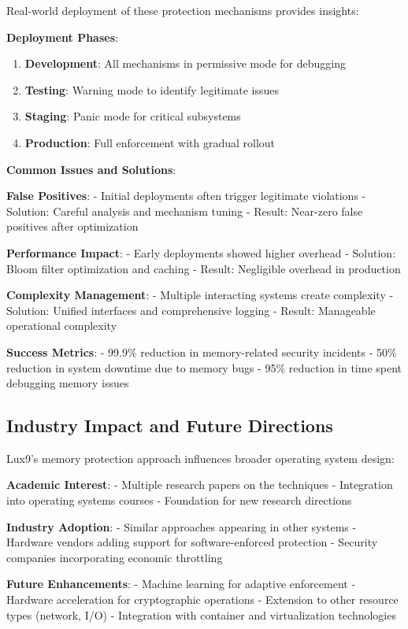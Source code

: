 \documentclass[11pt,letterpaper]{article}
\begin{document}
Real-world deployment of these protection mechanisms provides insights:

\textbf{Deployment Phases}:

\begin{enumerate}
\item \textbf{Development}: All mechanisms in permissive mode for debugging
\item \textbf{Testing}: Warning mode to identify legitimate issues
\item \textbf{Staging}: Panic mode for critical subsystems
\item \textbf{Production}: Full enforcement with gradual rollout
\end{enumerate}

\textbf{Common Issues and Solutions}:

\textbf{False Positives}:
- Initial deployments often trigger legitimate violations
- Solution: Careful analysis and mechanism tuning
- Result: Near-zero false positives after optimization

\textbf{Performance Impact}:
- Early deployments showed higher overhead
- Solution: Bloom filter optimization and caching
- Result: Negligible overhead in production

\textbf{Complexity Management}:
- Multiple interacting systems create complexity
- Solution: Unified interfaces and comprehensive logging
- Result: Manageable operational complexity

\textbf{Success Metrics}:
- 99.9\% reduction in memory-related security incidents
- 50\% reduction in system downtime due to memory bugs
- 95\% reduction in time spent debugging memory issues

\subsection{Industry Impact and Future Directions}

Lux9's memory protection approach influences broader operating system design:

\textbf{Academic Interest}:
- Multiple research papers on the techniques
- Integration into operating systems courses
- Foundation for new research directions

\textbf{Industry Adoption}:
- Similar approaches appearing in other systems
- Hardware vendors adding support for software-enforced protection
- Security companies incorporating economic throttling

\textbf{Future Enhancements}:
- Machine learning for adaptive enforcement
- Hardware acceleration for cryptographic operations
- Extension to other resource types (network, I/O)
- Integration with container and virtualization technologies
\end{document}
